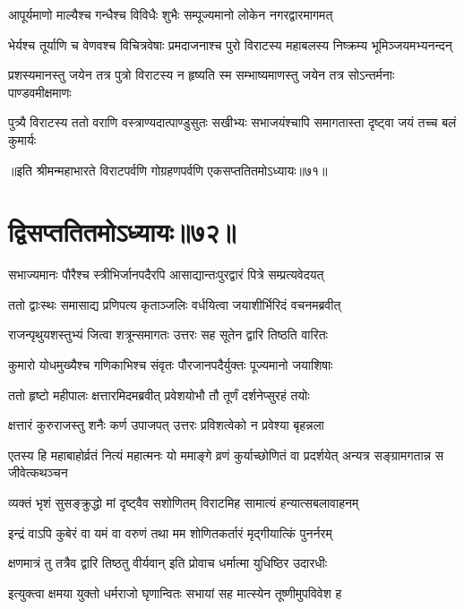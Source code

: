 \twolineshloka
{आपूर्यमाणो माल्यैश्च गन्धैश्च विविधैः शुभैः}
{सम्पूज्यमानो लोकेन नगरद्वारमागमत्}


\fourlineindentedshloka
{भेर्यश्च तूर्याणि च वेणवश्च}
{विचित्रवेषाः प्रमदाजनाश्च}
{पुरो विराटस्य महाबलस्य}
{निष्क्रम्य भूमिञ्जयमभ्यनन्दन्}


\fourlineindentedshloka
{प्रशस्यमानस्तु जयेन तत्र}
{पुत्रो विराटस्य न हृष्यति स्म}
{सम्भाष्यमाणस्तु जयेन तत्र}
{सोऽन्तर्मनाः पाण्डवमीक्षमाणः}


\fourlineindentedshloka
{पुत्र्यै विराटस्य ततो वराणि}
{वस्त्राण्यदात्पाण्डुसुतः सखीभ्यः}
{सभाजयंश्चापि समागतास्ता}
{दृष्ट्वा जयं तच्च बलं कुमार्यः}

॥इति श्रीमन्महाभारते विराटपर्वणि गोग्रहणपर्वणि एकसप्ततितमोऽध्यायः॥७१॥

\chapter{द्विसप्ततितमोऽध्यायः॥७२॥}

\twolineshloka
{सभाज्यमानः पौरैश्च स्त्रीभिर्जानपदैरपि}
{आसाद्यान्तःपुरद्वारं पित्रे सम्प्रत्यवेदयत्}


\twolineshloka
{ततो द्वाःस्थः समासाद्य प्रणिपत्य कृताञ्जलिः}
{वर्धयित्वा जयाशीर्भिरिदं वचनमब्रवीत्}


\twolineshloka
{राजन्पृथुयशस्तुभ्यं जित्वा शत्रून्समागतः}
{उत्तरः सह सूतेन द्वारि तिष्ठति वारितः}


\twolineshloka
{कुमारो योधमुख्यैश्च गणिकाभिश्च संवृतः}
{पौरजानपदैर्युक्तः पूज्यमानो जयाशिषाः}


\twolineshloka
{ततो हृष्टो महीपालः क्षत्तारमिदमब्रवीत्}
{प्रवेशयोभौ तौ तूर्णं दर्शनेप्सुरहं तयोः}


\twolineshloka
{क्षत्तारं कुरुराजस्तु शनैः कर्ण उपाजपत्}
{उत्तरः प्रविशत्वेको न प्रवेश्या बृहन्नला}


\threelineshloka
{एतस्य हि महाबाहोर्व्रतं नित्यं महात्मनः}
{यो ममाङ्गे व्रणं कुर्याच्छोणितं वा प्रदर्शयेत्}
{अन्यत्र सङ्ग्रामगतान्न स जीवेत्कथञ्चन}


\twolineshloka
{व्यक्तं भृशं सुसङ्क्रुद्धो मां दृष्ट्वैव सशोणितम्}
{विराटमिह सामात्यं हन्यात्सबलावाहनम्}


\twolineshloka
{इन्द्रं वाऽपि कुबेरं वा यमं वा वरुणं तथा}
{मम शोणितकर्तारं मृद्गीयात्किं पुनर्नरम्}


\twolineshloka
{क्षणमात्रं तु तत्रैव द्वारि तिष्ठतु वीर्यवान्}
{इति प्रोवाच धर्मात्मा युधिष्ठिर उदारधीः}


\twolineshloka
{इत्युक्त्वा क्षमया युक्तो धर्मराजो घृणान्वितः}
{सभायां सह मात्स्येन तूष्णीमुपविवेश ह}


